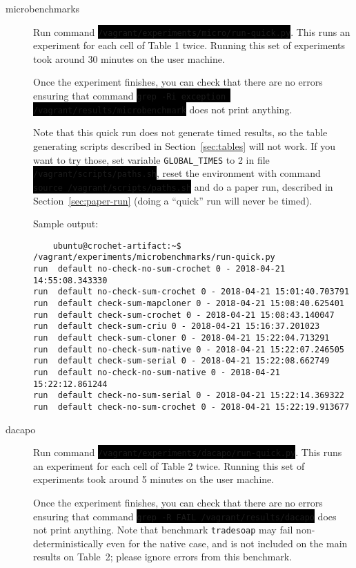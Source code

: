 \documentclass[12pt]{article}
\newcommand{\command}[1]{\colorbox{black}{\texttt{\color{white}#1}}}
\begin{document}
\begin{description}

    \item[microbenchmarks] Run command
        \command{/vagrant/experiments/micro/run-quick.py}.  This runs an
        experiment for each cell of Table 1 twice.  Running this set of
        experiments took around 30 minutes on the user machine.

        Once the experiment finishes, you can check that there are no errors
        ensuring that command \command{grep -Ri exception /vagrant/results/microbenchmark}
        does not print anything.

        Note that this quick run does not generate timed results, so the
        table generating scripts described in Section~\ref{sec:tables} will not
        work.  If you want to try those, set variable \texttt{GLOBAL\_TIMES} to
        2 in file \command{/vagrant/scripts/paths.sh}, reset the environment with
        command \command{source /vagrant/scripts/paths.sh} and do a paper run,
        described in Section~\ref{sec:paper-run} (doing a ``quick'' run will never be timed).

Sample output:
\begin{verbatim}
	ubuntu@crochet-artifact:~$ /vagrant/experiments/microbenchmarks/run-quick.py 
run  default no-check-no-sum-crochet 0 - 2018-04-21 14:55:08.343330
run  default no-check-sum-crochet 0 - 2018-04-21 15:01:40.703791
run  default check-sum-mapcloner 0 - 2018-04-21 15:08:40.625401
run  default check-sum-crochet 0 - 2018-04-21 15:08:43.140047
run  default check-sum-criu 0 - 2018-04-21 15:16:37.201023
run  default check-sum-cloner 0 - 2018-04-21 15:22:04.713291
run  default no-check-sum-native 0 - 2018-04-21 15:22:07.246505
run  default check-sum-serial 0 - 2018-04-21 15:22:08.662749
run  default no-check-no-sum-native 0 - 2018-04-21 15:22:12.861244
run  default check-no-sum-serial 0 - 2018-04-21 15:22:14.369322
run  default check-no-sum-crochet 0 - 2018-04-21 15:22:19.913677
\end{verbatim}
    \item[dacapo] Run command \command{/vagrant/experiments/dacapo/run-quick.py}.
        This runs an experiment for each cell of Table 2 twice.  Running this
        set of experiments took around 5 minutes on the user machine.

        Once the experiment finishes, you can check that there are no errors
        ensuring that command \command{grep -R FAIL /vagrant/results/dacapo} does not
        print anything.  Note that benchmark \texttt{tradesoap} may fail
        non-deterministically even for the native case, and is not included on
        the main results on Table~2; please ignore errors from this benchmark.


\end{description}
\end{document}
